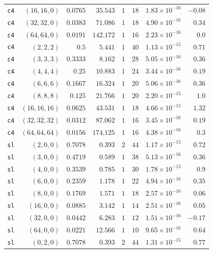 \begin{longtable}{lrrrrrrr}
\texttt{c4} & $(16,16,0)$ & $0.0765$ & $35.543$ & $1$ & $18$ & $1.83{\times}10^{-16}$ & $-0.08$ \\
\texttt{c4} & $(32,32,0)$ & $0.0383$ & $71.086$ & $1$ & $18$ & $4.90{\times}10^{-16}$ & $0.34$ \\
\texttt{c4} & $(64,64,0)$ & $0.0191$ & $142.172$ & $1$ & $16$ & $2.23{\times}10^{-16}$ & $0.0$ \\
\texttt{c4} & $(2,2,2)$ & $0.5$ & $5.441$ & $1$ & $40$ & $1.13{\times}10^{-15}$ & $0.71$ \\
\texttt{c4} & $(3,3,3)$ & $0.3333$ & $8.162$ & $1$ & $28$ & $5.05{\times}10^{-16}$ & $0.36$ \\
\texttt{c4} & $(4,4,4)$ & $0.25$ & $10.883$ & $1$ & $24$ & $3.44{\times}10^{-16}$ & $0.19$ \\
\texttt{c4} & $(6,6,6)$ & $0.1667$ & $16.324$ & $1$ & $20$ & $5.06{\times}10^{-16}$ & $0.36$ \\
\texttt{c4} & $(8,8,8)$ & $0.125$ & $21.766$ & $1$ & $20$ & $2.20{\times}10^{-15}$ & $1.0$ \\
\texttt{c4} & $(16,16,16)$ & $0.0625$ & $43.531$ & $1$ & $18$ & $4.66{\times}10^{-15}$ & $1.32$ \\
\texttt{c4} & $(32,32,32)$ & $0.0312$ & $87.062$ & $1$ & $16$ & $3.45{\times}10^{-16}$ & $0.19$ \\
\texttt{c4} & $(64,64,64)$ & $0.0156$ & $174.125$ & $1$ & $16$ & $4.38{\times}10^{-16}$ & $0.3$ \\
\texttt{sl} & $(2,0,0)$ & $0.7078$ & $0.393$ & $2$ & $44$ & $1.17{\times}10^{-15}$ & $0.72$ \\
\texttt{sl} & $(3,0,0)$ & $0.4719$ & $0.589$ & $1$ & $38$ & $5.13{\times}10^{-16}$ & $0.36$ \\
\texttt{sl} & $(4,0,0)$ & $0.3539$ & $0.785$ & $1$ & $30$ & $1.78{\times}10^{-15}$ & $0.9$ \\
\texttt{sl} & $(6,0,0)$ & $0.2359$ & $1.178$ & $1$ & $22$ & $4.94{\times}10^{-16}$ & $0.35$ \\
\texttt{sl} & $(8,0,0)$ & $0.1769$ & $1.571$ & $1$ & $18$ & $2.57{\times}10^{-16}$ & $0.06$ \\
\texttt{sl} & $(16,0,0)$ & $0.0885$ & $3.142$ & $1$ & $14$ & $2.51{\times}10^{-16}$ & $0.05$ \\
\texttt{sl} & $(32,0,0)$ & $0.0442$ & $6.283$ & $1$ & $12$ & $1.51{\times}10^{-16}$ & $-0.17$ \\
\texttt{sl} & $(64,0,0)$ & $0.0221$ & $12.566$ & $1$ & $10$ & $9.65{\times}10^{-16}$ & $0.64$ \\
\texttt{sl} & $(0,2,0)$ & $0.7078$ & $0.393$ & $2$ & $44$ & $1.31{\times}10^{-15}$ & $0.77$ \\

\end{longtable}

